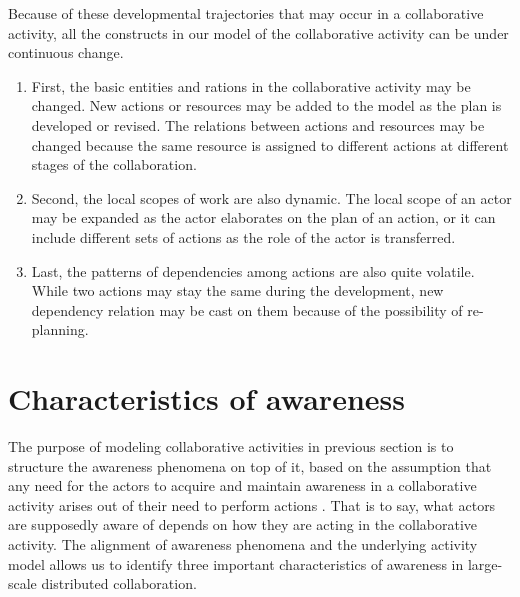 Because of these developmental trajectories that may occur in a collaborative activity, all the constructs in our model of the collaborative activity can be under continuous change. 
\begin{enumerate}
	\item First, the basic entities and rations in the collaborative activity may be changed. New actions or resources may be added to the model as the plan is developed or revised. The relations between actions and resources may be changed because the same resource is assigned to different actions at different stages of the collaboration.
	\item Second, the local scopes of work are also dynamic.  The local scope of an actor may be expanded as the actor elaborates on the plan of an action, or it can include different sets of actions as the role of the actor is transferred.
	\item Last, the patterns of dependencies among actions are also quite volatile. While two actions may stay the same during the development, new dependency relation may be cast on them because of the possibility of re-planning.
\end{enumerate}

\section{Characteristics of awareness} %
\label{sec:awareness_requirements}
The purpose of modeling collaborative activities in previous section is to structure the awareness phenomena on top of it, based on the assumption that any need for the actors to acquire and maintain awareness in a collaborative activity arises out of their need to perform actions \cite{schmidt2002a}. That is to say, what actors are supposedly aware of depends on how they are acting in the collaborative activity. The alignment of awareness phenomena and the underlying activity model allows us to identify three important characteristics of awareness in large-scale distributed collaboration.

